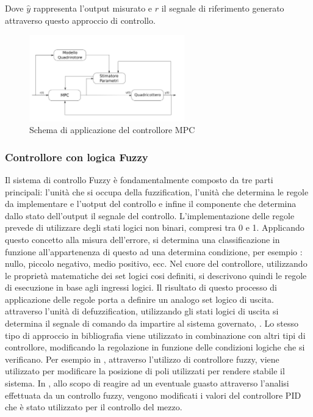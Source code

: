Dove $\hat{y}$ rappresenta l'output misurato e $r$ il segnale di riferimento generato attraverso questo approccio di controllo.

\begin{figure}
	\centering
	\includegraphics[width=0.6\textwidth]{SistemaQuadrirotore/Figure/MPC}
	\caption{Schema di applicazione del controllore MPC}
\end{figure}

\subsubsection{Controllore con logica Fuzzy}

Il sistema di controllo Fuzzy è fondamentalmente composto da tre parti principali: l'unità che si occupa della fuzzification, l'unità che determina le regole da implementare e l'uotput del controllo e infine il componente che determina dallo stato dell'output il segnale del controllo. 
L'implementazione delle regole prevede di utilizzare degli stati logici non binari, compresi tra 0 e 1. Applicando questo concetto alla misura dell'errore, si determina una classificazione in funzione all'appartenenza di questo ad una determina condizione, per esempio : nullo, piccolo negativo, medio positivo, ecc. Nel cuore del controllore, utilizzando le proprietà matematiche dei set logici cosi definiti, si descrivono quindi le regole di esecuzione in base agli ingressi logici. Il risultato di questo processo di applicazione delle regole porta a definire un analogo set logico di uscita. attraverso l'unità di defuzzification, utilizzando gli stati logici di uscita si determina il segnale di comando da impartire al sistema governato, \cite{ChenGuanrong2001ItFS}.
Lo stesso tipo di approccio in bibliografia viene utilizzato in combinazione con altri tipi di controllore, modificando la regolazione in funzione delle condizioni logiche che si verificano.
Per esempio in \cite{6988024}, attraverso l'utilizzo di controllore fuzzy, viene utilizzato per modificare la posizione di poli utilizzati per rendere stabile il sistema. In \cite{AmoozgarMohammadHadi2012FFGP}, allo scopo di reagire ad un eventuale guasto attraverso l'analisi effettuata da un controllo fuzzy, vengono modificati i valori del controllore PID che è stato utilizzato per il controllo del mezzo.


